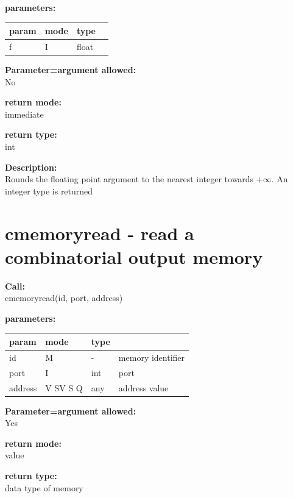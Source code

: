         {\bf parameters:} \\
        \begin{tabular}{| l | l | l | l |}
        \hline
        param  & mode & type & \\
        \hline \hline
        f & I & float & \\ \hline
        \end{tabular}
        
        {\bf Parameter=argument allowed:} \\
        No
        
        {\bf return mode:} \\
        immediate

        {\bf return type:} \\
        int
        
        {\bf Description:} \\
        Rounds the floating point argument to the nearest integer towards
        $+\infty$.
        An integer type is returned


    \section{cmemoryread - read a combinatorial output memory}\label{sec:ifcmemoryread}
        
        {\bf Call:} \\
        cmemoryread(id, port, address)
        
        {\bf parameters:} \\
        \begin{tabular}{| l | l | l | l |}
        \hline
        param  & mode & type & \\
        \hline \hline
        id      & M        &  -  & memory identifier    \\ \hline
        port    & I        & int & port                 \\ \hline
        address & V SV S Q & any & address value        \\ \hline
        \end{tabular}
        
        {\bf Parameter=argument allowed:} \\
        Yes
        
        {\bf return mode:} \\
        value

        {\bf return type:} \\
        data type of memory
        

